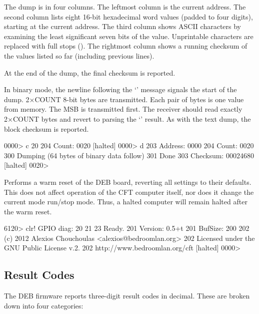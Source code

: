 \begin{description}
The dump is in four columns. The leftmost column is the current
address. The second column lists eight 16-bit hexadecimal word values
(padded to four digits), starting at the current address. The third
column shows ASCII characters by examining the least significant seven
bits of the value. Unprintable characters are replaced with full stops
(). The rightmost column shows a running checksum of the values
listed so far (including previous lines).

At the end of the dump, the final checksum is reported.

In binary mode, the newline following the ‘’ message
signals the start of the dump. 2×COUNT 8-bit bytes are
transmitted. Each pair of bytes is one value from memory. The
\gls{MSB} is transmitted first. The receiver should read exactly
2×COUNT bytes and revert to parsing the ‘’ result. As
with the text dump, the block checksum is reported.

\begin{debcode}
[halted] 0000> c 20
204 Count: 0020
[halted] 0000> d
203 Address: 0000
204 Count: 0020
300 Dumping
(64 bytes of binary data follow)
301 Done
303 Checksum: 00024680
[halted] 0020>
\end{debcode}



\item{\bfseries{}} Performs a warm reset of the \gls{DEB} board,
  reverting all settings to their defaults. This does not affect
  operation of the CFT computer itself, nor does it change the current
  mode run/stop mode. Thus, a halted computer will remain halted after
  the warm reset.

\begin{debcode}
[halted] 6120> clr!
GPIO diag: 20 21 23 Ready.
201 Version: 0.5+t
201 BufSize: 200
202 (c) 2012 Alexios Chouchoulas <alexios@bedroomlan.org>
202 Licensed under the GNU Public License v.2.
202 http://www.bedroomlan.org/cft
[halted] 0000>
\end{debcode}

\end{description}

\subsection{Result Codes}

The \gls{DEB} firmware reports three-digit result codes in
decimal. These are broken down into four categories:

